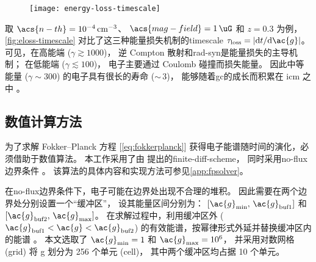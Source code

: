 \begin{figure}[htp]
  \centering
  \texttt{[image: energy-loss-timescale]}
  \label{fig:eloss-timescale}
\end{figure}

取 $\acs{n-th} = \SI{e-4}{\per\cubic\cm}$、
$\acs{mag-field} = \SI{1}{\uG}$ 和 $z = 0.3$ 为例，
\autoref{fig:eloss-timescale} 对比了这三种能量损失机制的\ac{timescale}
$\tau_{\R{loss}} = |\D{t}/\D{\ac{g}}|$。
可见，在高能端 ($\gamma \gtrsim 1000$)，
逆 Compton 散射和\ac{rad-syn}是能量损失的主导机制；
在低能端 ($\gamma \lesssim 100$)，
电子主要通过 Coulomb 碰撞而损失能量。
因此中等能量 ($\gamma \sim 300$) 的电子具有很长的寿命 ($\sim$\,\SI{3}{\Gyr})，
能够随着\ac{gc}的成长而积累在 \ac{icm} 之中 \cite{sarazin1999}。

\subsection{数值计算方法}
\label{sec:numerical}

为了求解 Fokker--Planck 方程 [\autoref{eq:fokkerplanck}]
获得电子能谱随时间的演化，必须借助于数值算法。
本工作采用了由  提出的\ac{finite-diff-scheme}，
同时采用\ac{no-flux}边界条件 \cite{park1996}。
该算法的具体内容和实现方法可参见\autoref{app:fpsolver}。

在\ac{no-flux}边界条件下，电子可能在边界处出现不合理的堆积。
因此需要在两个边界处分别设置一个\enquote{缓冲区}，
设其能量区间分别为：
$[\ac{g}_{\R{min}}, \,\ac{g}_{\R{buf1}}]$ 和
$[\ac{g}_{\R{buf2}}, \,\ac{g}_{\R{max}}]$。
在求解过程中，利用缓冲区外 ($\ac{g}_{\R{buf1}} < \ac{g} < \ac{g}_{\R{buf2}}$)
的有效能谱，按幂律形式外延并替换缓冲区内的能谱 \cite{borovsky1986,donnert2014}。
本文选取了 $\ac{g}_{\R{min}} = 1$ 和 $\ac{g}_{\R{max}} = \num{e6}$，
并采用对数网格 (grid) 将 \ac{g} 划分为 256 个单元 (cell)，
其中两个缓冲区均占据 10 个单元。

